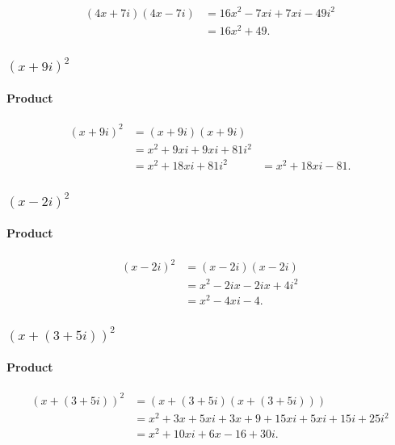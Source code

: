 \begin{align}
  (4x + 7i)(4x - 7i) &= 16x^2 - 7xi + 7xi - 49i^2 \\
                     &= 16x^2 + 49
.\end{align}

\subsubsection{$(x + 9i)^2$}

\paragraph{Product}

\begin{align}
  (x + 9i)^2 &= (x + 9i)(x + 9i) \\
             &= x^2 + 9xi + 9xi + 81i^2 \\
             &= x^2 + 18xi + 81i^2
             &= x^2 + 18xi - 81
.\end{align}

\subsubsection{$(x - 2i)^2$}

\paragraph{Product}

\begin{align}
  (x - 2i)^2 &= (x - 2i)(x - 2i) \\
             &= x^2 - 2ix - 2ix + 4i^2 \\
             &= x^2 - 4xi - 4
.\end{align}

\subsubsection{$(x + (3 + 5i))^2$}

\paragraph{Product}

\begin{align}
  (x + (3 + 5i))^2 &= (x + (3 + 5i)(x + (3 + 5i))) \\
                   &= x^2 + 3x + 5xi + 3x + 9 + 15xi + 5xi + 15i + 25i^2 \\
                   &= x^2 + 10xi + 6x - 16 + 30i
.\end{align}

